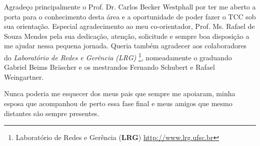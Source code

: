 \begin{agradecimentos}

Agradeço principalmente o Prof. Dr. Carlos Becker Westphall por ter me aberto a
porta para o conhecimento desta área e a oportunidade de poder fazer o TCC sob
sua orientação. Especial agradecimento ao meu co-orientador, Prof. Ms. Rafael de
Souza Mendes pela sua dedicação, atenção, solicitude e sempre boa disposição a
me ajudar nessa pequena jornada. Queria também agradecer aos colaboradores do
\emph{Laboratório de Redes e Gerência (LRG)} \footnote{Laboratório de Redes e
Gerência (\textbf{LRG}) \url{http://www.lrg.ufsc.br}}, nomeadamente o graduando
Gabriel Beims Bräscher e os mestrandos Fernando Schubert e Rafael Weingartner.

Nunca poderia me esquecer dos meus pais que sempre me apoiaram, minha esposa que
acompanhou de perto essa fase final e meus amigos que mesmo distantes são sempre
presentes.


\end{agradecimentos}